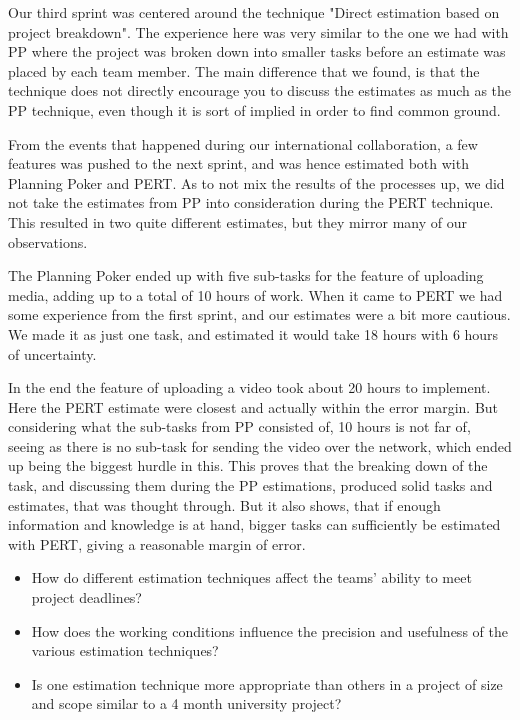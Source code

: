 Our third sprint was centered around the technique "Direct estimation based on project breakdown". The experience here was very similar to the one we had with PP where the project was broken down into smaller tasks before an estimate was placed by each team member. The main difference that we found, is that the technique does not directly encourage you to discuss the estimates as much as the PP technique, even though it is sort of implied in order to find common ground.



From the events that happened during our international collaboration, a few features was pushed to the next sprint, and was hence estimated both with Planning Poker and PERT. As to not mix the results of the processes up, we did not take the estimates from PP into consideration during the PERT technique. This resulted in two quite different estimates, but they mirror many of our observations.\

The Planning Poker ended up with five sub-tasks for the feature of uploading media, adding up to a total of 10 hours of work. When it came to PERT we had some experience from the first sprint, and our estimates were a bit more cautious. We made it as just one task, and estimated it would take 18 hours with 6 hours of uncertainty.\

In the end the feature of uploading a video took about 20 hours to implement. Here the PERT estimate were closest and actually within the error margin. But considering what the sub-tasks from PP consisted of, 10 hours is not far of, seeing as there is no sub-task for sending the video over the network, which ended up being the biggest hurdle in this. This proves that the breaking down of the task, and discussing them during the PP estimations, produced solid tasks and estimates, that was thought through. But it also shows, that if enough information and knowledge is at hand, bigger tasks can sufficiently be estimated with PERT, giving a reasonable margin of error. \


\begin{itemize}
\item How do different estimation techniques affect the teams' ability to meet project deadlines?

\item How does the working conditions influence the precision and usefulness of the various estimation techniques?	

\item Is one estimation technique more appropriate than others in a project of size and scope similar to a 4 month university project?
\end{itemize}
















